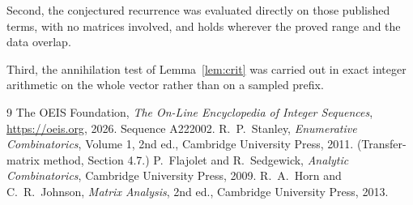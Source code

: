\documentclass[11pt,a4paper]{article}
\theoremstyle{plain}
\theoremstyle{definition}
\begin{document}
Second, the conjectured recurrence was evaluated directly on those published terms, with no
matrices involved, and holds wherever the proved range and the data overlap.

Third, the annihilation test of Lemma~\ref{lem:crit} was carried out in exact integer
arithmetic on the whole vector rather than on a sampled prefix.

\begin{thebibliography}{9}
 The OEIS Foundation, \emph{The On-Line Encyclopedia of Integer
Sequences}, \url{https://oeis.org}, 2026. Sequence A222002.
 R.~P.~Stanley, \emph{Enumerative Combinatorics}, Volume 1, 2nd ed.,
Cambridge University Press, 2011. (Transfer-matrix method, Section 4.7.)
 P.~Flajolet and R.~Sedgewick, \emph{Analytic Combinatorics}, Cambridge
University Press, 2009.
 R.~A.~Horn and C.~R.~Johnson, \emph{Matrix Analysis}, 2nd ed., Cambridge
University Press, 2013.
\end{thebibliography}
\end{document}

